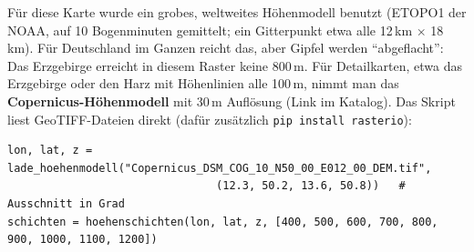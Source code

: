 \begin{ausgabe}
\begin{passend}
%
\end{passend}
\end{ausgabe}


\begin{hinweis}[Auflösung]
	Für diese Karte wurde ein grobes, weltweites Höhenmodell benutzt (ETOPO1 der NOAA, auf 10 Bogenminuten gemittelt; ein Gitterpunkt etwa alle 12\,km $\times$ 18\,km). Für Deutschland im Ganzen reicht das, aber Gipfel werden \enquote{abgeflacht}: Das Erzgebirge erreicht in diesem Raster keine 800\,m. Für Detailkarten, etwa das Erzgebirge oder den Harz mit Höhenlinien alle 100\,m, nimmt man das \textbf{Copernicus-Höhenmodell} mit 30\,m Auflösung (Link im Katalog). Das Skript liest GeoTIFF-Dateien direkt (dafür zusätzlich \texttt{pip install rasterio}):
\end{hinweis}

\begin{lstlisting}[style=latex]
lon, lat, z = lade_hoehenmodell("Copernicus_DSM_COG_10_N50_00_E012_00_DEM.tif",
                                (12.3, 50.2, 13.6, 50.8))   # Ausschnitt in Grad
schichten = hoehenschichten(lon, lat, z, [400, 500, 600, 700, 800, 900, 1000, 1100, 1200])
\end{lstlisting}


